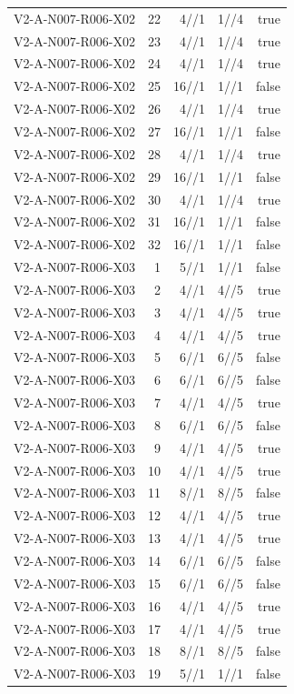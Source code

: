 {\begin{longtable}{lrrrr}
V2-A-N007-R006-X02 & 22 & 4//1 & 1//4 & true \\
V2-A-N007-R006-X02 & 23 & 4//1 & 1//4 & true \\
V2-A-N007-R006-X02 & 24 & 4//1 & 1//4 & true \\
V2-A-N007-R006-X02 & 25 & 16//1 & 1//1 & false \\
V2-A-N007-R006-X02 & 26 & 4//1 & 1//4 & true \\
V2-A-N007-R006-X02 & 27 & 16//1 & 1//1 & false \\
V2-A-N007-R006-X02 & 28 & 4//1 & 1//4 & true \\
V2-A-N007-R006-X02 & 29 & 16//1 & 1//1 & false \\
V2-A-N007-R006-X02 & 30 & 4//1 & 1//4 & true \\
V2-A-N007-R006-X02 & 31 & 16//1 & 1//1 & false \\
V2-A-N007-R006-X02 & 32 & 16//1 & 1//1 & false \\
V2-A-N007-R006-X03 & 1 & 5//1 & 1//1 & false \\
V2-A-N007-R006-X03 & 2 & 4//1 & 4//5 & true \\
V2-A-N007-R006-X03 & 3 & 4//1 & 4//5 & true \\
V2-A-N007-R006-X03 & 4 & 4//1 & 4//5 & true \\
V2-A-N007-R006-X03 & 5 & 6//1 & 6//5 & false \\
V2-A-N007-R006-X03 & 6 & 6//1 & 6//5 & false \\
V2-A-N007-R006-X03 & 7 & 4//1 & 4//5 & true \\
V2-A-N007-R006-X03 & 8 & 6//1 & 6//5 & false \\
V2-A-N007-R006-X03 & 9 & 4//1 & 4//5 & true \\
V2-A-N007-R006-X03 & 10 & 4//1 & 4//5 & true \\
V2-A-N007-R006-X03 & 11 & 8//1 & 8//5 & false \\
V2-A-N007-R006-X03 & 12 & 4//1 & 4//5 & true \\
V2-A-N007-R006-X03 & 13 & 4//1 & 4//5 & true \\
V2-A-N007-R006-X03 & 14 & 6//1 & 6//5 & false \\
V2-A-N007-R006-X03 & 15 & 6//1 & 6//5 & false \\
V2-A-N007-R006-X03 & 16 & 4//1 & 4//5 & true \\
V2-A-N007-R006-X03 & 17 & 4//1 & 4//5 & true \\
V2-A-N007-R006-X03 & 18 & 8//1 & 8//5 & false \\
V2-A-N007-R006-X03 & 19 & 5//1 & 1//1 & false \\

\end{longtable}}
